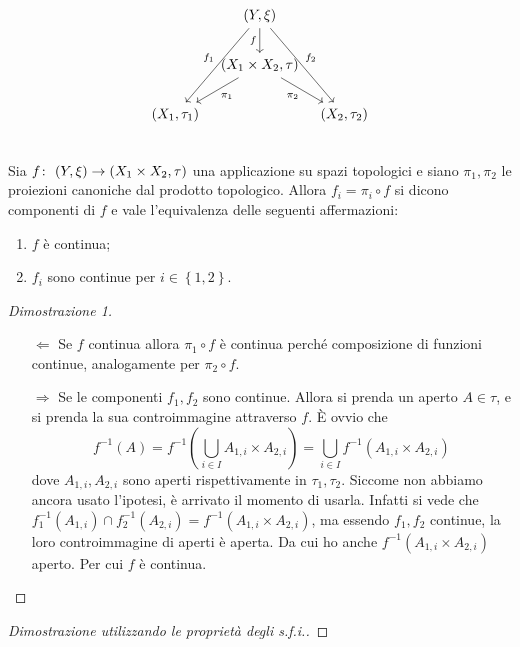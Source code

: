 \begin{theorem}
	\begin{equation*}
		\begin{tikzcd}[column sep=0.7em]
		& (Y, \xi) \arrow[swap]{d}{f} \arrow[swap]{ddl}{f_1} \arrow{ddr}{f_2} & \\
		& (X_1 \times X_2, \tau) \arrow[swap]{dr}{\pi_2} \arrow{dl}{\pi_1} & \\
		(X_1, \tau_1) &  & (X_2, \tau_2)\\
		\end{tikzcd}
	\end{equation*}
	Sia $f \colon\ (Y, \xi) \rightarrow (X_1 \times X_2, \tau)$ una applicazione su spazi topologici e siano $\pi_1,\pi_2$ le proiezioni canoniche dal prodotto topologico. Allora $f_i = \pi_i \circ f$ si dicono componenti di $f$ e vale l'equivalenza delle seguenti affermazioni:
	\begin{enumerate}
		\item $f$ è continua;
		\item $f_i$ sono continue per $i \in \left\{1,2\right\}$.
	\end{enumerate}
\end{theorem}
\begin{proof}[Dimostrazione 1]
	\begin{enumerate}
		\item[$\Leftarrow$] Se $f$ continua allora $\pi_1 \circ f$ è continua perché composizione di funzioni continue, analogamente per $\pi_2 \circ f$.
		\item[$\Rightarrow$] Se le componenti $f_1, f_2$ sono continue. Allora si prenda un aperto $A \in \tau$, e si prenda la sua controimmagine attraverso $f$. È ovvio che 
		\begin{equation*}
			f^{-1}(A) = f^{-1}(\bigcup_{i \in I} A_{1,i} \times A_{2,i}) = \bigcup_{i \in I} f^{-1}(A_{1,i} \times A_{2,i})
		\end{equation*}
		dove $A_{1,i}, A_{2,i}$ sono aperti rispettivamente in $\tau_1, \tau_2$. Siccome non abbiamo ancora usato l'ipotesi, è arrivato il momento di usarla. Infatti si vede che $f^{-1}_1(A_{1,i}) \cap f^{-1}_2(A_{2,i}) = f^{-1}(A_{1,i} \times A_{2,i})$, ma essendo $f_1, f_2$ continue, la loro controimmagine di aperti è aperta. Da cui ho anche $f^{-1}(A_{1,i} \times A_{2,i})$ aperto. Per cui $f$ è continua. 
	\end{enumerate}
\end{proof}
\begin{proof}[Dimostrazione utilizzando le proprietà degli s.f.i.]
\end{proof}

